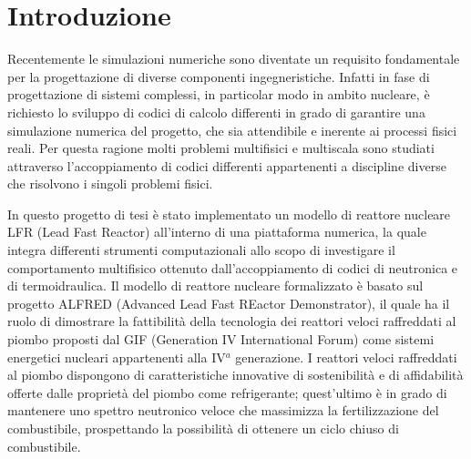 \chapter*{Introduzione}

Recentemente le simulazioni numeriche sono diventate un requisito fondamentale 
per la progettazione di diverse componenti ingegneristiche. 
Infatti in fase di progettazione di sistemi complessi, in particolar modo in 
ambito nucleare, è richiesto lo sviluppo di codici di calcolo differenti in 
grado di garantire una simulazione numerica del progetto, che sia attendibile e 
inerente ai processi fisici reali.
Per questa ragione molti problemi multifisici e multiscala sono studiati 
attraverso l'accoppiamento di codici differenti appartenenti a discipline diverse che 
risolvono i singoli problemi fisici.

In questo progetto di tesi è stato implementato un modello di reattore nucleare 
LFR (Lead Fast Reactor) all'interno di una piattaforma numerica, la quale 
integra differenti strumenti computazionali allo scopo di investigare il 
comportamento multifisico ottenuto dall'accoppiamento di codici di neutronica e 
di termoidraulica.
Il modello di reattore nucleare formalizzato è basato sul progetto ALFRED 
(Advanced Lead Fast REactor Demonstrator), il quale ha il ruolo di dimostrare la 
fattibilità della tecnologia dei reattori veloci raffreddati al piombo proposti 
dal GIF (Generation IV International Forum) come sistemi energetici nucleari 
appartenenti alla IV$^{a}$ generazione.
I reattori veloci raffreddati al piombo dispongono di caratteristiche innovative di 
sostenibilità e di affidabilità offerte dalle proprietà del piombo come 
refrigerante; quest'ultimo è in grado di mantenere uno spettro neutronico veloce 
che massimizza la fertilizzazione del combustibile, prospettando la possibilità di 
ottenere un ciclo chiuso di combustibile.

